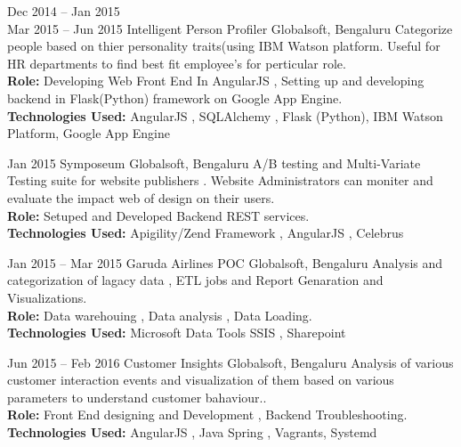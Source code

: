 \documentclass[print]{friggeri-cv} %
\begin{document}
\begin{entrylist}
\entry
{ Dec 2014 -- Jan 2015\\
Mar 2015 -- Jun 2015}
{Intelligent Person Profiler}
{Globalsoft, Bengaluru}
{Categorize people based on thier personality traits(using IBM Watson platform. Useful for HR departments to find best fit employee's for perticular role.\\
\textbf{Role:} Developing Web Front End In AngularJS , Setting up and developing backend in Flask(Python) framework on Google App Engine.\\
\textbf{Technologies Used:} AngularJS , SQLAlchemy , Flask (Python), IBM Watson Platform, Google App Engine}
\end{entrylist}

\begin{entrylist}
\entry
{Jan 2015}
{Symposeum}
{Globalsoft, Bengaluru}
{A/B testing and Multi-Variate Testing suite for website publishers . Website Administrators can moniter and evaluate the impact web of design on their users.\\
\textbf{Role:} Setuped and Developed Backend REST services.\\
\textbf{Technologies Used:} Apigility/Zend Framework , AngularJS , Celebrus}
\end{entrylist}

\begin{entrylist}
\entry
{Jan 2015 -- Mar 2015}
{Garuda Airlines POC}
{Globalsoft, Bengaluru}
{Analysis and categorization of lagacy data , ETL jobs and Report Genaration and Visualizations.\\
\textbf{Role:} Data warehouing , Data analysis , Data Loading.\\
\textbf{Technologies Used:} Microsoft Data Tools SSIS , Sharepoint}
\end{entrylist}

\begin{entrylist}
\entry
{Jun 2015 -- Feb 2016}
{Customer Insights}
{Globalsoft, Bengaluru}
{Analysis of various customer interaction events and visualization of them based on various parameters to understand customer bahaviour..\\
\textbf{Role:} Front End designing and Development , Backend Troubleshooting.\\
\textbf{Technologies Used:} AngularJS , Java Spring , Vagrants, Systemd}


\end{entrylist}
\end{document}
